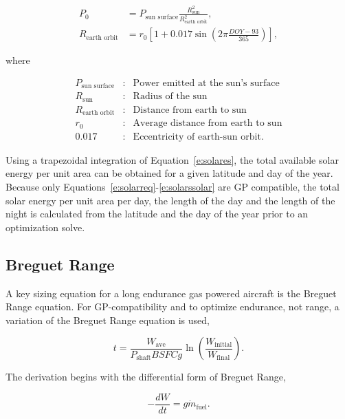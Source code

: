 \documentclass[]{aiaa-tc}%
\begin{document}
    \begin{align}
        \label{e:solarp0}
        P_0 & = P_{\text{sun surface}} \frac{R_{\text{sun}}^2}{R_{\text{earth orbit}}^2}, \\
        \label{e:solareo}
        R_{\text{earth orbit}} & = r_0 \left[ 1 + 0.017 \sin{\left( 2\pi \frac{DOY-93}{365}\right)} \right],
    \end{align}
    
    where 

    \[ \begin{array}{lcl}
        P_{\text{sun surface}} & : & \text{Power emitted at the sun's surface} \\
        R_{\text{sun}} & : & \text{Radius of the sun} \\
        R_{\text{earth orbit}} & : & \text{Distance from earth to sun} \\
        r_0 & : & \text{Average distance from earth to sun} \\
        0.017 & : & \text{Eccentricity of earth-sun orbit}.
    \end{array} \]

    Using a trapezoidal integration of Equation~\eqref{e:solares}, the total available solar energy per unit area can be obtained for a given latitude and day of the year. Because only Equations~\ref{e:solarreq}-\ref{e:solarssolar} are GP compatible, the total solar energy per unit area per day, the length of the day and the length of the night is calculated from the latitude and the day of the year prior to an optimization solve.

\subsection{Breguet Range}

A key sizing equation for a long endurance gas powered aircraft is the Breguet Range equation.  
For GP-compatibility and to optimize endurance, not range, a variation of the Breguet Range equation is used, 

\begin{equation}
    \label{e:breguetendurance}
    t = \frac{W_{\text{ave}}}{P_{\text{shaft}}BSFCg} \ln{\left( \frac{W_{\text{initial}}}{W_{\text{final}}}\right)}.
\end{equation}

The derivation begins with the differential form of Breguet Range,\cite{br2}

\begin{equation}
    \label{e:breguetdiff}
    -\frac{dW}{dt} = g\dot{m}_{\text{fuel}}.
\end{equation}
\end{document}
